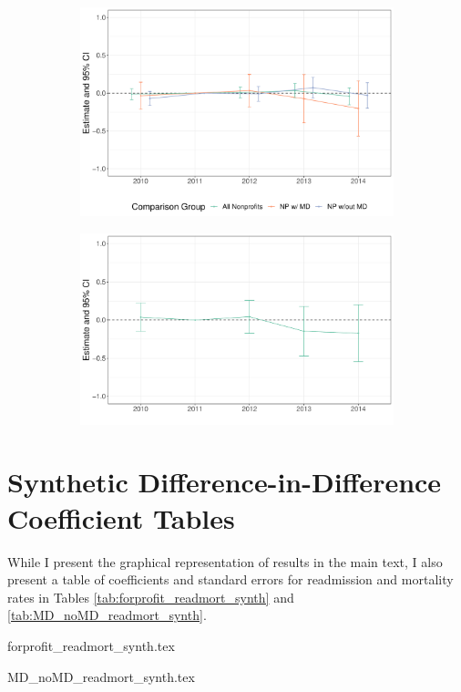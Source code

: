 \documentclass[12pt]{article}
\begin{document}
\begin{figure}[ht!]
\begin{subfigure}[b]{0.45\textwidth}
         \centering
         \caption{}
         \includegraphics[width=\textwidth]{Objects/mort_forprofit_es_graph.pdf}
         \label{fig:es_plotc}
     \end{subfigure}
     \hfill
     \begin{subfigure}[b]{0.45\textwidth}
         \centering
         \caption{}
         \includegraphics[width=\textwidth]{Objects/mort_MD_es_graph.pdf}
         \label{fig:es_plotd}
     \end{subfigure}
        \label{fig:es_plot}
    \end{figure}




\section{Synthetic Difference-in-Difference Coefficient Tables}

While I present the graphical representation of results in the main text, I also present a table of coefficients and standard errors for readmission and mortality rates in Tables \ref{tab:forprofit_readmort_synth} and \ref{tab:MD_noMD_readmort_synth}.

{forprofit_readmort_synth.tex}

{MD_noMD_readmort_synth.tex}


    

    

    

    

    

    

	
	
	
\end{document}
